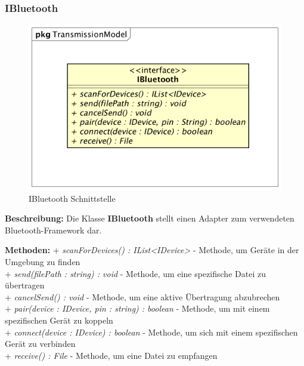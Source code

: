 \documentclass[a4paper]{scrreprt}
\begin{document}
\subsubsection{IBluetooth}
\begin{figure}[H]
\centering
\includegraphics[width=0.55\textheight]{graphics/Klassendiagramme/Model/IBluetooth.png}
\caption{IBluetooth Schnittstelle}
\end{figure}

\textbf{Beschreibung:} Die Klasse \textbf{IBluetooth} stellt einen Adapter zum verwendeten Bluetooth-Framework dar.

\textbf{Methoden:}
+ \textit{scanForDevices() : IList<IDevice>} - Methode, um Geräte in der Umgebung zu finden\\
+ \textit{send(filePath : string) : void} - Methode, um eine spezifische Datei zu übertragen\\
+ \textit{cancelSend() : void} - Methode, um eine aktive Übertragung abzubrechen\\
+ \textit{pair(device : IDevice, pin : string) : boolean} - Methode, um mit einem spezifischen Gerät zu koppeln\\
+ \textit{connect(device : IDevice) : boolean} - Methode, um sich mit einem spezifischen Gerät zu verbinden\\
+ \textit{receive() : File} - Methode, um eine Datei zu empfangen\\
\end{document}
